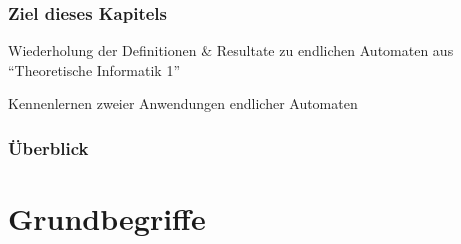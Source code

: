  \begin{frame}
    \frametitle{Ziel dieses Kapitels}
    
    \begin{Itemize}
      \item
        Wiederholung der Definitionen \& Resultate zu endlichen Automaten
        aus "`Theoretische Informatik 1"'
        
        \par\bigskip
      \item
        Kennenlernen zweier Anwendungen endlicher Automaten
    \end{Itemize}
  
  \end{frame}

  \begin{frame}
    \frametitle{Überblick}
    \tableofcontents
  \end{frame}

  \section{Grundbegriffe}
  
